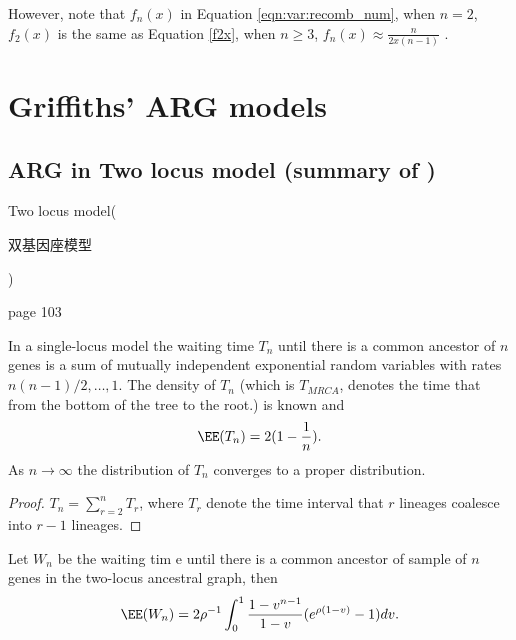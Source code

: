 However, note that $f_n(x)$ in Equation \eqref{eqn:var:recomb_num}, when $n=2$, $f_2(x)$ is the same as Equation \eqref{f2x}, when $n\geq 3$, $f_n(x)\approx\frac{n}{2x(n-1)}$ \citet{Hudson1985}.








\section{Griffiths' \citep{Griffiths1991,Griffiths1997ARG} ARG models}

\subsection{ARG in Two locus model (summary of \citet{Griffiths1991})}
Two locus model(\begin{CJK*}{UTF8}{gbsn}双基因座模型\end{CJK*})
\citep{Griffiths1981}

\citet{Griffiths1981} page 103

In a single-locus model the waiting time $T_n$ until there is a common ancestor of $n$ genes is a sum of mutually independent exponential random variables with rates $n(n-1)/2, \dots, 1$. The density of $T_n$ (which is $T_{MRCA}$, denotes the time that from the bottom of the tree to the root.) is known \citep{Tavare1984} and 
$$\EE(T_n)=2(1-\frac{1}{n}).$$ As $n\to \infty$ the distribution of $T_n$ converges to a proper distribution.

\begin{proof}
$T_n=\sum^n_{r=2}T_r$, where $T_r$ denote the time interval that $r$ lineages coalesce into $r-1$ lineages. 
\end{proof}

\begin{theorem}
Let $W_n$ be the waiting tim e until there is a common ancestor of sample of $n$ genes in the two-locus ancestral graph, then
$$\EE(W_n)=2\rho^{-1}\int^1_{0} \frac{1-v^{n-1}}{1-v}(e^{\rho(1-v)}-1)dv.$$
\end{theorem}




